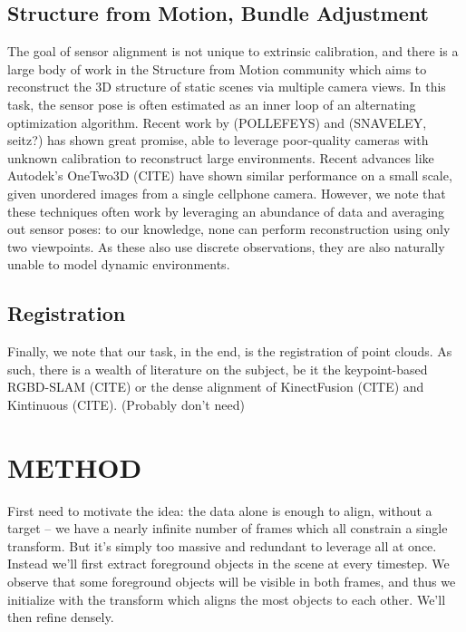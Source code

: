 \documentclass[letterpaper, 10 pt, conference]{ieeeconf}  %
\begin{document}
\subsection{Structure from Motion, Bundle Adjustment}

The goal of sensor alignment is not unique to extrinsic calibration, and there is a large body of work in the 
Structure from Motion community which aims to reconstruct the 3D structure of static scenes via multiple camera 
views. In this task, the sensor pose is often estimated as an inner loop of an alternating optimization algorithm. 
Recent work by (POLLEFEYS) and (SNAVELEY, seitz?) has shown great promise, able to leverage poor-quality cameras with 
unknown calibration to reconstruct large environments. Recent advances like Autodek's OneTwo3D (CITE) have shown 
similar performance on a small scale, given unordered images from a single cellphone camera. However, we note 
that these techniques often work by leveraging an abundance of data and averaging out sensor poses: to our knowledge, 
none can perform reconstruction using only two viewpoints. As these also use discrete observations, they are also 
naturally unable to model dynamic environments.

\subsection{Registration}
Finally, we note that our task, in the end, is the registration of point clouds. As such, there is a wealth of 
literature on the subject, be it the keypoint-based RGBD-SLAM (CITE) or the dense alignment of KinectFusion (CITE) 
and Kintinuous (CITE). (Probably don't need)






\section{METHOD}

First need to motivate the idea: the data alone is enough to align, without a target -- we have a nearly infinite number of frames which all constrain a single transform. But it's simply too massive 
and redundant to leverage all at once. Instead we'll first extract foreground objects in the scene at every timestep. 
We observe that some foreground objects will be visible in both frames, and thus we initialize with the transform which aligns the most objects to each other. We'll then refine densely.
\end{document}
